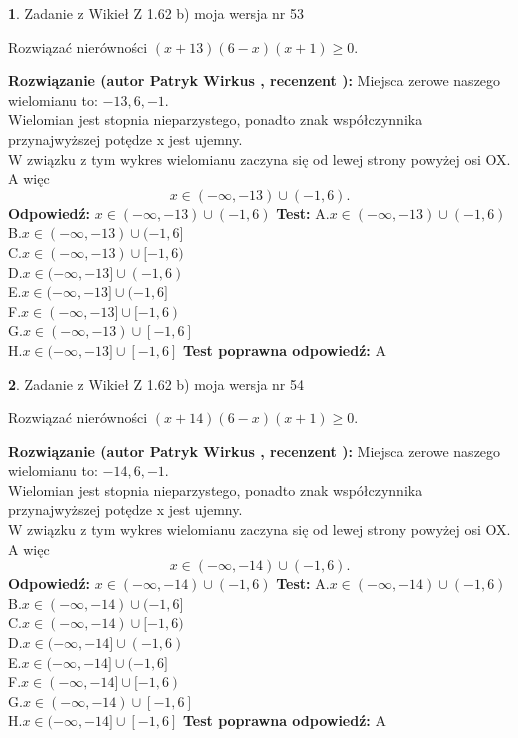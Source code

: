 \documentclass[12pt, a4paper]{article}
\theoremstyle{definition} %
\newtheorem{zad}{}
\newcommand{\zadStart}[1]{\begin{zad}#1\newline}
\newcommand{\zadStop}{\end{zad}}
\newcommand{\rozwStart}[2]{\noindent \textbf{Rozwiązanie (autor #1 , recenzent #2): }\newline}
\newcommand{\rozwStop}{\newline}
\newcommand{\odpStart}{\noindent \textbf{Odpowiedź:}\newline}
\newcommand{\odpStop}{\newline}
\newcommand{\testStart}{\noindent \textbf{Test:}\newline}
\newcommand{\testStop}{\newline}
\newcommand{\kluczStart}{\noindent \textbf{Test poprawna odpowiedź:}\newline}
\newcommand{\kluczStop}{\newline}
\begin{document}
\zadStart{Zadanie z Wikieł Z 1.62 b) moja wersja nr 53}

Rozwiązać nierówności $(x+13)(6-x)(x+1)\ge0$.
\zadStop
\rozwStart{Patryk Wirkus}{}
Miejsca zerowe naszego wielomianu to: $-13, 6, -1$.\\
Wielomian jest stopnia nieparzystego, ponadto znak współczynnika przy\linebreak najwyższej potędze x jest ujemny.\\ W związku z tym wykres wielomianu zaczyna się od lewej strony powyżej osi OX. A więc $$x \in (-\infty,-13) \cup (-1,6).$$
\rozwStop
\odpStart
$x \in (-\infty,-13) \cup (-1,6)$
\odpStop
\testStart
A.$x \in (-\infty,-13) \cup (-1,6)$\\
B.$x \in (-\infty,-13) \cup (-1,6]$\\
C.$x \in (-\infty,-13) \cup [-1,6)$\\
D.$x \in (-\infty,-13] \cup (-1,6)$\\
E.$x \in (-\infty,-13] \cup (-1,6]$\\
F.$x \in (-\infty,-13] \cup [-1,6)$\\
G.$x \in (-\infty,-13) \cup [-1,6]$\\
H.$x \in (-\infty,-13] \cup [-1,6]$
\testStop
\kluczStart
A
\kluczStop



\zadStart{Zadanie z Wikieł Z 1.62 b) moja wersja nr 54}

Rozwiązać nierówności $(x+14)(6-x)(x+1)\ge0$.
\zadStop
\rozwStart{Patryk Wirkus}{}
Miejsca zerowe naszego wielomianu to: $-14, 6, -1$.\\
Wielomian jest stopnia nieparzystego, ponadto znak współczynnika przy\linebreak najwyższej potędze x jest ujemny.\\ W związku z tym wykres wielomianu zaczyna się od lewej strony powyżej osi OX. A więc $$x \in (-\infty,-14) \cup (-1,6).$$
\rozwStop
\odpStart
$x \in (-\infty,-14) \cup (-1,6)$
\odpStop
\testStart
A.$x \in (-\infty,-14) \cup (-1,6)$\\
B.$x \in (-\infty,-14) \cup (-1,6]$\\
C.$x \in (-\infty,-14) \cup [-1,6)$\\
D.$x \in (-\infty,-14] \cup (-1,6)$\\
E.$x \in (-\infty,-14] \cup (-1,6]$\\
F.$x \in (-\infty,-14] \cup [-1,6)$\\
G.$x \in (-\infty,-14) \cup [-1,6]$\\
H.$x \in (-\infty,-14] \cup [-1,6]$
\testStop
\kluczStart
A
\kluczStop
\end{document}
